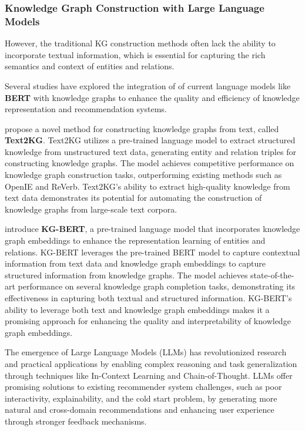 \documentclass{article}
\begin{document}
\subsubsection{Knowledge Graph Construction with Large Language Models}
However, the traditional KG construction methods often lack the ability to
incorporate textual information, which is essential for capturing the rich
semantics and context of entities and relations.

Several studies have explored the integration of of current language models
like \textbf{BERT} with knowledge graphs to enhance the quality and efficiency
of knowledge representation and recommendation systems.

\textbf{\cite{xu2021text2kg}} propose a novel method for constructing knowledge
graphs from text, called \textbf{Text2KG}. Text2KG utilizes a pre-trained
language model to extract structured knowledge from unstructured text data,
generating entity and relation triples for constructing knowledge graphs. The
model achieves competitive performance on knowledge graph construction tasks,
outperforming existing methods such as OpenIE and ReVerb. Text2KG's ability to
extract high-quality knowledge from text data demonstrates its potential for
automating the construction of knowledge graphs from large-scale text corpora.

\textbf{\cite{zhang2021kgbert}} introduce \textbf{KG-BERT}, a pre-trained
language model that incorporates knowledge graph embeddings to enhance the
representation learning of entities and relations. KG-BERT leverages the
pre-trained BERT model to capture contextual information from text data and
knowledge graph embeddings to capture structured information from knowledge
graphs. The model achieves state-of-the-art performance on several knowledge
graph completion tasks, demonstrating its effectiveness in capturing both
textual and structured information. KG-BERT's ability to leverage both text and
knowledge graph embeddings makes it a promising approach for enhancing the
quality and interpretability of knowledge graph embeddings.

The emergence of Large Language Models (LLMs) has revolutionized research and
practical applications by enabling complex reasoning and task generalization
through techniques like In-Context Learning and Chain-of-Thought. LLMs offer
promising solutions to existing recommender system challenges, such as poor
interactivity, explainability, and the cold start problem, by generating more
natural and cross-domain recommendations and enhancing user experience through
stronger feedback mechanisms.
\end{document}
